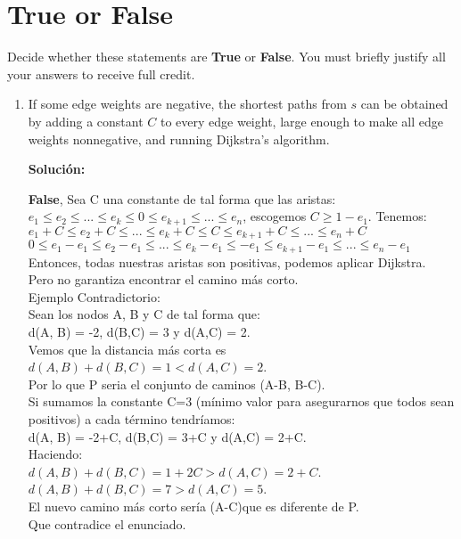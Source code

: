 \documentclass{article}
\begin{document}
  
\section{True or False}

  Decide whether these statements are {\bf True} or {\bf False}. You
  must briefly justify all your answers to receive full credit.

  \begin{enumerate}

  \item If some edge weights are negative, the
    shortest paths from $s$ can be obtained by adding a constant $C$
    to every edge weight, large enough to make all edge weights
    nonnegative, and running Dijkstra's algorithm.
  
  \textbf{Solución:}
  
  \textbf{False}, Sea C una constante de tal forma que las aristas:\\
  $e_1 \leq e_2 \leq ... \leq e_k \leq 0 \leq e_{k+1} \leq ... \leq e_n$, escogemos $C \geq 1 -e_{1}$. Tenemos:\\
  $e_1 + C \leq e_2 + C \leq ... \leq e_k + C \leq C \leq e_{k+1} + C \leq ... \leq e_n + C$\\
  $0 \leq e_1 - e_1 \leq e_2 - e_1 \leq ... \leq e_k - e_1 \leq - e_1 \leq e_{k+1} - e_1 \leq ... \leq e_n - e_1$\\
  Entonces, todas nuestras aristas son positivas, podemos aplicar Dijkstra.\\
  Pero no garantiza encontrar el camino más corto.\\
  
  Ejemplo Contradictorio:\\
  Sean los nodos A, B y C de tal forma que:\\
  d(A, B) = -2, d(B,C) = 3 y d(A,C) = 2.\\
  Vemos que la distancia más corta es $d(A,B) + d(B,C) = 1 < d(A,C) = 2$.\\
  Por lo que P seria el conjunto de caminos (A-B, B-C).\\
  Si sumamos la constante C=3 (mínimo valor para asegurarnos que todos sean positivos) a cada término tendríamos:\\
  d(A, B) = -2+C, d(B,C) = 3+C y d(A,C) = 2+C.\\
  Haciendo:\\
  $d(A,B) + d(B,C) = 1+2C > d(A,C) = 2+C$.\\
  $d(A,B) + d(B,C) = 7 > d(A,C) = 5$.\\
  El nuevo camino más corto sería (A-C)que es diferente de P.\\
  Que contradice el enunciado.


\end{enumerate}
\end{document}

